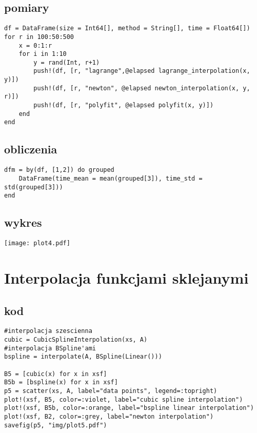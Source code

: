 \subsection{\bf pomiary}
\begin{lstlisting}
df = DataFrame(size = Int64[], method = String[], time = Float64[])
for r in 100:50:500
    x = 0:1:r
    for i in 1:10
        y = rand(Int, r+1)
        push!(df, [r, "lagrange",@elapsed lagrange_interpolation(x, y)])        
        push!(df, [r, "newton", @elapsed newton_interpolation(x, y, r)])
        push!(df, [r, "polyfit", @elapsed polyfit(x, y)])
    end
end
\end{lstlisting}

\subsection{\bf obliczenia}
\begin{lstlisting}
dfm = by(df, [1,2]) do grouped
    DataFrame(time_mean = mean(grouped[3]), time_std = std(grouped[3]))
end
\end{lstlisting}

\subsection{\bf wykres}
\begin{center}
    \texttt{[image: plot4.pdf]}
    \label{fig:4}
\end{center}
\clearpage
\section{\bf Interpolacja funkcjami sklejanymi}
\subsection{\bf kod}
\begin{lstlisting}
#interpolacja szescienna 
cubic = CubicSplineInterpolation(xs, A)
#interpolacja BSpline'ami
bspline = interpolate(A, BSpline(Linear()))

B5 = [cubic(x) for x in xsf]
B5b = [bspline(x) for x in xsf]
p5 = scatter(xs, A, label="data points", legend=:topright)
plot!(xsf, B5, color=:violet, label="cubic spline interpolation")
plot!(xsf, B5b, color=:orange, label="bspline linear interpolation")
plot!(xsf, B2, color=:grey, label="newton interpolation")
savefig(p5, "img/plot5.pdf")
\end{lstlisting}

